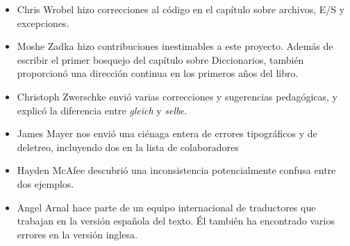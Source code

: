\begin{itemize}
\item Chris Wrobel hizo correcciones al código en el capítulo sobre 
archivos, E/S y excepciones. 


\item Moshe Zadka hizo contribuciones inestimables a este proyecto.  Además
de escribir el primer bosquejo del capítulo sobre Diccionarios, también 
proporcionó una dirección continua en los primeros años del libro.


\item Christoph Zwerschke envió varias correcciones y sugerencias 
pedagógicas, y explicó la diferencia entre {\em gleich} y {\em selbe}.

\item James Mayer nos envió una ciénaga entera de  errores tipográficos 
y de deletreo, incluyendo dos en la lista de colaboradores


\item Hayden McAfee descubrió una inconsistencia potencialmente confusa 
entre dos ejemplos.

\item Angel Arnal hace parte de un equipo internacional de traductores que
trabajan en la versión española del texto.  Él también ha encontrado varios errores 
en la versión inglesa.


\end{itemize}
